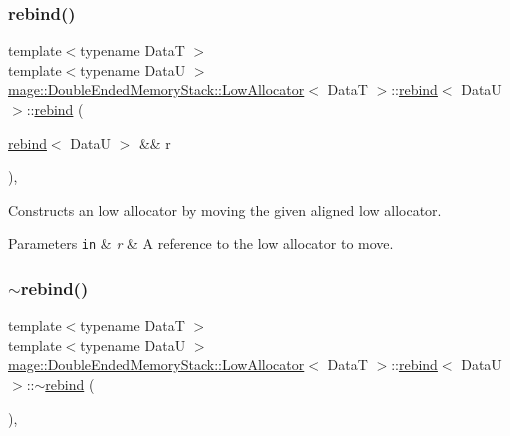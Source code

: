 \subsubsection{\texorpdfstring{rebind()}{rebind()}\hspace{0.1cm}{\footnotesize\ttfamily [3/3]}}
{\footnotesize\ttfamily template$<$typename DataT $>$ \\
template$<$typename DataU $>$ \\
\hyperlink{structmage_1_1_double_ended_memory_stack_1_1_low_allocator}{mage\+::\+Double\+Ended\+Memory\+Stack\+::\+Low\+Allocator}$<$ DataT $>$\+::\hyperlink{structmage_1_1_double_ended_memory_stack_1_1_low_allocator_1_1rebind}{rebind}$<$ DataU $>$\+::\hyperlink{structmage_1_1_double_ended_memory_stack_1_1_low_allocator_1_1rebind}{rebind} (\begin{DoxyParamCaption}\item[{\hyperlink{structmage_1_1_double_ended_memory_stack_1_1_low_allocator_1_1rebind}{rebind}$<$ DataU $>$ \&\&}]{r }\end{DoxyParamCaption})\hspace{0.3cm}{\ttfamily [private]}, {\ttfamily [delete]}}

Constructs an low allocator by moving the given aligned low allocator.


\begin{DoxyParams}[1]{Parameters}
\mbox{\tt in}  & {\em r} & A reference to the low allocator to move. \\
\hline
\end{DoxyParams}
\hypertarget{structmage_1_1_double_ended_memory_stack_1_1_low_allocator_1_1rebind_a54b1fa630e8a021ced000f950748f707}{}\label{structmage_1_1_double_ended_memory_stack_1_1_low_allocator_1_1rebind_a54b1fa630e8a021ced000f950748f707} 
\subsubsection{\texorpdfstring{$\sim$rebind()}{~rebind()}}
{\footnotesize\ttfamily template$<$typename DataT $>$ \\
template$<$typename DataU $>$ \\
\hyperlink{structmage_1_1_double_ended_memory_stack_1_1_low_allocator}{mage\+::\+Double\+Ended\+Memory\+Stack\+::\+Low\+Allocator}$<$ DataT $>$\+::\hyperlink{structmage_1_1_double_ended_memory_stack_1_1_low_allocator_1_1rebind}{rebind}$<$ DataU $>$\+::$\sim$\hyperlink{structmage_1_1_double_ended_memory_stack_1_1_low_allocator_1_1rebind}{rebind} (\begin{DoxyParamCaption}{ }\end{DoxyParamCaption})\hspace{0.3cm}{\ttfamily [private]}, {\ttfamily [delete]}}

